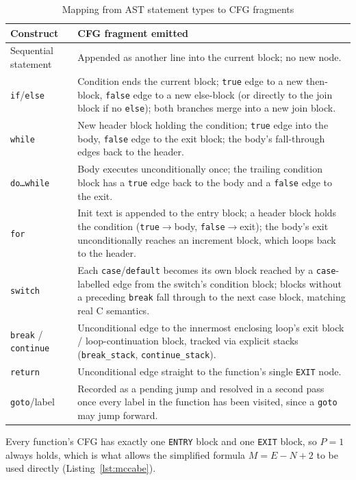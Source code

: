 \documentclass[11pt]{article}
\begin{document}
\begin{table}[h]
\centering
\small
\begin{tabular}{@{}p{2.6cm}p{9.6cm}@{}}
\toprule
\textbf{Construct} & \textbf{CFG fragment emitted} \\
\midrule
Sequential statement & Appended as another line into the current block; no new node. \\
\texttt{if}/\texttt{else} & Condition ends the current block; \texttt{true} edge to a new then-block, \texttt{false} edge to a new else-block (or directly to the join block if no \texttt{else}); both branches merge into a new join block. \\
\texttt{while} & New header block holding the condition; \texttt{true} edge into the body, \texttt{false} edge to the exit block; the body's fall-through edges back to the header. \\
\texttt{do\ldots while} & Body executes unconditionally once; the trailing condition block has a \texttt{true} edge back to the body and a \texttt{false} edge to the exit. \\
\texttt{for} & Init text is appended to the entry block; a header block holds the condition (\texttt{true}$\to$body, \texttt{false}$\to$exit); the body's exit unconditionally reaches an increment block, which loops back to the header. \\
\texttt{switch} & Each \texttt{case}/\texttt{default} becomes its own block reached by a \texttt{case}-labelled edge from the switch's condition block; blocks without a preceding \texttt{break} fall through to the next case block, matching real C semantics. \\
\texttt{break} / \texttt{continue} & Unconditional edge to the innermost enclosing loop's exit block / loop-continuation block, tracked via explicit stacks (\texttt{break\_stack}, \texttt{continue\_stack}). \\
\texttt{return} & Unconditional edge straight to the function's single \texttt{EXIT} node. \\
\texttt{goto}/label & Recorded as a pending jump and resolved in a second pass once every label in the function has been visited, since a \texttt{goto} may jump forward. \\
\bottomrule
\end{tabular}
\caption{Mapping from AST statement types to CFG fragments}
\label{tab:cfgrules}
\end{table}

Every function's CFG has exactly one \texttt{ENTRY} block and one \texttt{EXIT} block, so $P = 1$ always holds, which is what allows the simplified formula $M = E - N + 2$ to be used directly (Listing~\ref{lst:mccabe}).
\end{document}
